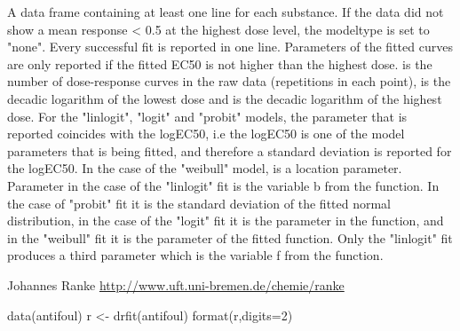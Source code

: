 \begin{Value}
\begin{ldescription}
\item[\code{results}] A data frame containing at least one line for each substance. If the data
did not show a mean response < 0.5 at the highest dose level, the
modeltype is set to "none".
Every successful fit is reported in one line. Parameters of the fitted
curves are only reported if the fitted EC50 is not higher than the
highest dose. 
 is the number of dose-response curves in the raw data (repetitions
in each point),  is the decadic logarithm of the lowest dose and
 is the decadic logarithm of the highest dose.
For the "linlogit", "logit" and "probit" models, the parameter
 that is reported coincides with the logEC50, i.e the logEC50 is 
one of the model parameters that is being fitted, and therefore
a standard deviation  is reported for the logEC50. In the 
case of the "weibull" model,  is a location parameter.
Parameter  in the case of the "linlogit" fit is the variable
b from the  function. In the case of "probit" fit
it is the standard deviation of the fitted normal distribution, in the case
of the "logit" fit it is the  parameter in the 
function, and in the "weibull" fit it is the  parameter of the
fitted  function. Only the "linlogit" fit produces a 
third parameter  which is the variable f from the
 function.
\end{ldescription}
\end{Value}
\begin{Author}\relax
Johannes Ranke 
\url{http://www.uft.uni-bremen.de/chemie/ranke}
\end{Author}
\begin{Examples}
\begin{ExampleCode}
data(antifoul)
r <- drfit(antifoul)
format(r,digits=2)
\end{ExampleCode}
\end{Examples}


